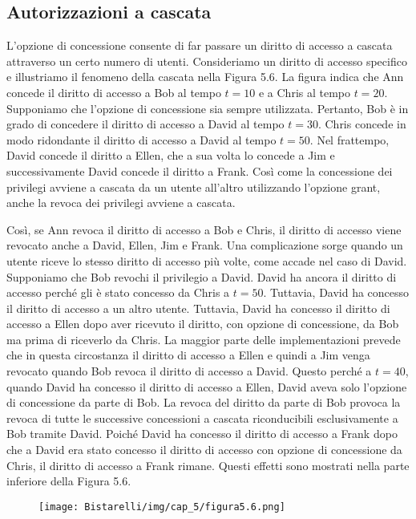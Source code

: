 \subsection{Autorizzazioni a cascata}
L'opzione di concessione consente di far passare un diritto di accesso a cascata attraverso un certo numero di utenti. 
Consideriamo un diritto di accesso specifico e illustriamo il fenomeno della cascata nella Figura 5.6. La figura indica che Ann concede il diritto di accesso a Bob al tempo $t = 10$ e a Chris al tempo $t = 20$. Supponiamo che l'opzione di concessione sia sempre utilizzata. Pertanto, Bob è in grado di concedere il diritto di accesso a David al tempo $t = 30$. Chris concede in modo ridondante il diritto di accesso a David al tempo $t = 50$. Nel frattempo, David concede il diritto a Ellen, che a sua volta lo concede a Jim e successivamente David concede il diritto a Frank. Così come la concessione dei privilegi avviene a cascata da un utente all'altro utilizzando l'opzione grant, anche la revoca dei privilegi avviene a cascata. 

\singlespacing

Così, se Ann revoca il diritto di accesso a Bob e Chris, il diritto di accesso viene revocato anche a David, Ellen, Jim e Frank. Una complicazione sorge quando un utente riceve lo stesso diritto di accesso più volte, come accade nel caso di David. Supponiamo che Bob revochi il privilegio a David. David ha ancora il diritto di accesso perché gli è stato concesso da Chris a $t = 50$. Tuttavia, David ha concesso il diritto di accesso a un altro utente. Tuttavia, David ha concesso il diritto di accesso a Ellen dopo aver ricevuto il diritto, con opzione di concessione, da Bob ma prima di riceverlo da Chris. La maggior parte delle implementazioni prevede che in questa circostanza il diritto di accesso a Ellen e quindi a Jim venga revocato quando Bob revoca il diritto di accesso a David. Questo perché a $t = 40$, quando David ha concesso il diritto di accesso a Ellen, David aveva solo l'opzione di concessione da parte di Bob. La revoca del diritto da parte di Bob provoca la revoca di tutte le successive concessioni a cascata riconducibili esclusivamente a Bob tramite David. Poiché David ha concesso il diritto di accesso a Frank dopo che a David era stato concesso il diritto di accesso con opzione di concessione da Chris, il diritto di accesso a Frank rimane. Questi effetti sono mostrati nella parte inferiore della Figura 5.6.

\begin{figure}[H]
	\centering
    \texttt{[image: Bistarelli/img/cap\_5/figura5.6.png]}
\end{figure}



